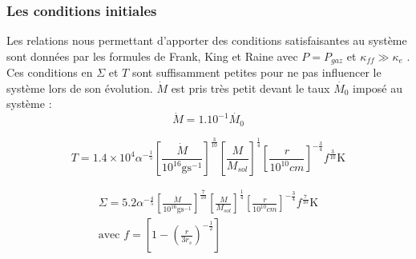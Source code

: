 \subsubsection{Les conditions initiales}
Les relations nous permettant d'apporter des conditions satisfaisantes au système sont données par les formules de Frank, King et Raine avec $P = P_{gaz}$ et $\kappa_{ff} \gg \kappa_{e}$ \cite{F_K_R-1985}. Ces conditions en $\Sigma$ et $T$ sont suffisamment petites pour ne pas influencer le système lors de son évolution. $\dot{M}$ est pris très petit devant  le taux $\dot{M_{0}}$ imposé au système : 
\begin{equation}
	\dot{M} = 1.10^{-1 }\dot{M_{0}}
\end{equation} 

\begin{equation}
	T = 1.4 \times 10^{4} \alpha^{- \frac{1}{5}} \left[ \frac{\dot{M}}{10^{16} \mbox{g} \mbox{s}^{-1}} \right]^{\frac{3}{10}} \left[ \frac{M}{M_{sol}}\right]^{\frac{1}{4}} \left[ \frac{r}{10^{10} cm}\right]^{- \frac{3}{4}} f^{\frac{3}{10}} \mbox{K} 
\end{equation}

\begin{align}
	\Sigma = 5.2 \alpha^{- \frac{4}{5}} \left[ \frac{\dot{M}}{10^{16} \mbox{g} \mbox{s}^{-1}} \right]^{\frac{7}{10}} \left[ \frac{M}{M_{sol}}\right]^{\frac{1}{4}} \left[ \frac{r}{10^{10} cm}\right]^{- \frac{3}{4}} f^{\frac{7}{10}} \mbox{K}  \\ 
	\text{avec } f = \left[ 1 - \left( \frac{r}{3 r_{s}}\right)^{- \frac{1}{2}}\right]
\end{align}

